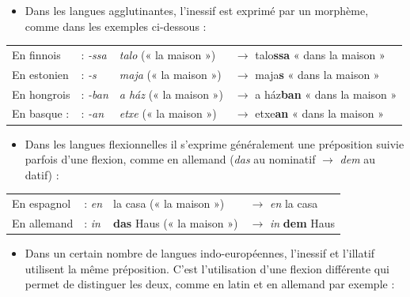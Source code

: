 \begin{itemize}
\item Dans les langues agglutinantes, l’inessif est exprimé par un morphème, comme dans les exemples ci-dessous :
\end{itemize}
\begin{center}\small
\begin{tabularx}{\linewidth}{@{}l l l >{\raggedright\arraybackslash}X@{}}
En finnois & : \textit{-ssa} & \textit{talo} (« la maison ») & $\rightarrow$ talo\textbf{ssa} « dans la maison »\\[.5em]
En estonien & : \textit{-s} & \textit{maja} (« la maison ») & $\rightarrow$ maja\textbf{s} « dans la maison »\\[.5em]
En hongrois & : \textit{-ban} & \textit{a ház} (« la maison ») & $\rightarrow$ a ház\textbf{ban} « dans la maison »\\[.5em]
En basque : & : \textit{-an} & \textit{etxe} (« la maison ») & $\rightarrow$ etxe\textbf{an} « dans la maison »\\
\end{tabularx}
\end{center}
\begin{itemize}
\item Dans les langues flexionnelles il s’exprime généralement une préposition suivie parfois d’une flexion, comme en allemand (\textit{das} au nominatif $\rightarrow$ \textit{dem} au datif) :
\end{itemize}
\begin{center}\small
\begin{tabularx}{\linewidth}{@{}l l l >{\raggedright\arraybackslash}X@{}}
En espagnol & : \textit{en} & la casa (« la maison ») & $\rightarrow$ \textit{en} la casa\\[.5em]
En allemand & : \textit{in} & \textbf{das} Haus (« la maison ») & $\rightarrow$ \textit{in} \textbf{dem} Haus\\
\end{tabularx}
\end{center}
\begin{itemize}
\item Dans un certain nombre de langues indo-européennes, l’inessif et l’illatif utilisent la même préposition. C’est l’utilisation d’une flexion différente qui permet de distinguer les deux, comme en latin et en allemand par exemple :
\end{itemize}
